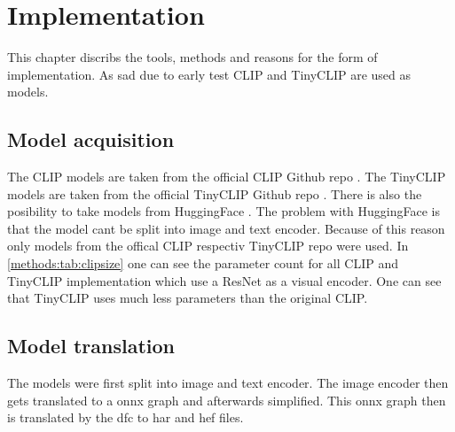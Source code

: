 \chapter{Implementation
    \label{chapter:implementation}}

This chapter discribs the tools, methods and reasons for the form of implementation.
As sad due to early test CLIP and TinyCLIP are used as models.

\section{Model acquisition}

The CLIP models are taken from the official CLIP Github repo \cite{clipgit}.
The TinyCLIP models are taken from the official TinyCLIP Github repo \cite{tinyclipgit}.
There is also the posibility to take models from HuggingFace \cite{huggingface}.
The problem with HuggingFace is that the model cant be split into image and text encoder.
Because of this reason only models from the offical CLIP respectiv TinyCLIP repo were used.
In \cref{methods:tab:clipsize} one can see the parameter count for all CLIP and TinyCLIP implementation which use a ResNet as a visual encoder.
One can see that TinyCLIP uses much less parameters than the original CLIP.


\section{Model translation}
The models were first split into image and text encoder.
The image encoder then gets translated to a onnx graph and afterwards simplified.
This onnx graph then is translated by the \acrshort{dfc} to \acrshort{har} and \acrshort{hef} files.

